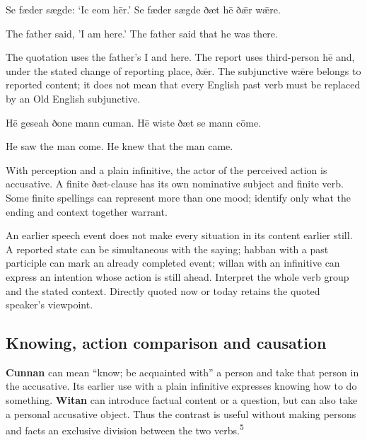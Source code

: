 Se fæder sægde: ‘Ic eom hēr.’ Se fæder sægde ðæt hē ðǣr wǣre.

The father said, 'I am here.' The father said that he was there.

The quotation uses the father’s I and here. The report uses third-person hē and, under the stated change of reporting place, ðǣr. The subjunctive wǣre belongs to reported content; it does not mean that every English past verb must be replaced by an Old English subjunctive.

Hē geseah ðone mann cuman. Hē wiste ðæt se mann cōme.

He saw the man come. He knew that the man came.

With perception and a plain infinitive, the actor of the perceived action is accusative. A finite ðæt-clause has its own nominative subject and finite verb. Some finite spellings can represent more than one mood; identify only what the ending and context together warrant.

An earlier speech event does not make every situation in its content earlier still. A reported state can be simultaneous with the saying; habban with a past participle can mark an already completed event; willan with an infinitive can express an intention whose action is still ahead. Interpret the whole verb group and the stated context. Directly quoted now or today retains the quoted speaker’s viewpoint.

\subsection*{Knowing, action comparison and causation}

\textbf{Cunnan} can mean “know; be acquainted with” a person and take that person in the accusative. Its earlier use with a plain infinitive expresses knowing how to do something. \textbf{Witan} can introduce factual content or a question, but can also take a personal accusative object. Thus the contrast is useful without making persons and facts an exclusive division between the two verbs.\textsuperscript{5}

